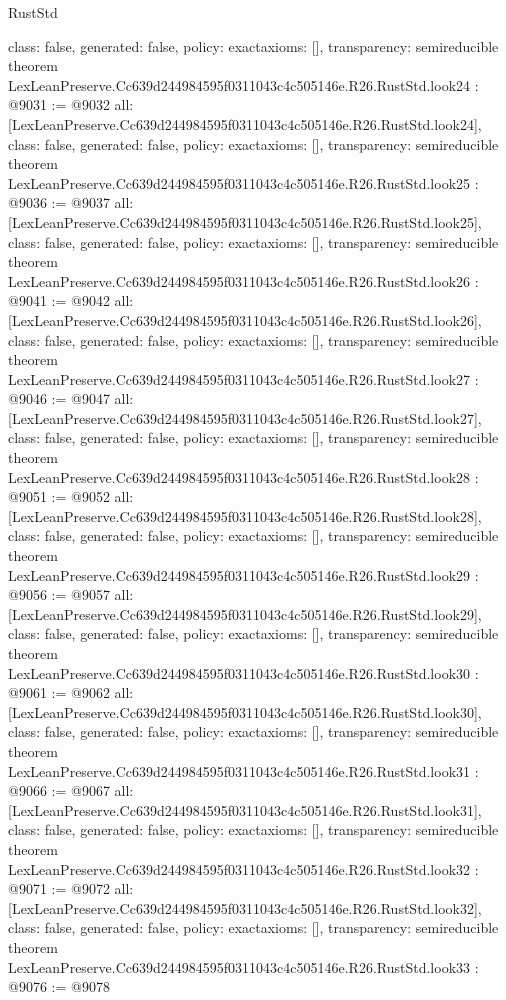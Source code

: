 \begin{lexlean}{RustStd}
\begin{coremodule}
{  class: false,
  generated: false,
  policy: exact{axioms: []},
  transparency: semireducible
}
theorem LexLeanPreserve.Cc639d244984595f0311043c4c505146e.R26.RustStd.look24 : @9031 := @9032 {
  all: [LexLeanPreserve.Cc639d244984595f0311043c4c505146e.R26.RustStd.look24],
  class: false,
  generated: false,
  policy: exact{axioms: []},
  transparency: semireducible
}
theorem LexLeanPreserve.Cc639d244984595f0311043c4c505146e.R26.RustStd.look25 : @9036 := @9037 {
  all: [LexLeanPreserve.Cc639d244984595f0311043c4c505146e.R26.RustStd.look25],
  class: false,
  generated: false,
  policy: exact{axioms: []},
  transparency: semireducible
}
theorem LexLeanPreserve.Cc639d244984595f0311043c4c505146e.R26.RustStd.look26 : @9041 := @9042 {
  all: [LexLeanPreserve.Cc639d244984595f0311043c4c505146e.R26.RustStd.look26],
  class: false,
  generated: false,
  policy: exact{axioms: []},
  transparency: semireducible
}
theorem LexLeanPreserve.Cc639d244984595f0311043c4c505146e.R26.RustStd.look27 : @9046 := @9047 {
  all: [LexLeanPreserve.Cc639d244984595f0311043c4c505146e.R26.RustStd.look27],
  class: false,
  generated: false,
  policy: exact{axioms: []},
  transparency: semireducible
}
theorem LexLeanPreserve.Cc639d244984595f0311043c4c505146e.R26.RustStd.look28 : @9051 := @9052 {
  all: [LexLeanPreserve.Cc639d244984595f0311043c4c505146e.R26.RustStd.look28],
  class: false,
  generated: false,
  policy: exact{axioms: []},
  transparency: semireducible
}
theorem LexLeanPreserve.Cc639d244984595f0311043c4c505146e.R26.RustStd.look29 : @9056 := @9057 {
  all: [LexLeanPreserve.Cc639d244984595f0311043c4c505146e.R26.RustStd.look29],
  class: false,
  generated: false,
  policy: exact{axioms: []},
  transparency: semireducible
}
theorem LexLeanPreserve.Cc639d244984595f0311043c4c505146e.R26.RustStd.look30 : @9061 := @9062 {
  all: [LexLeanPreserve.Cc639d244984595f0311043c4c505146e.R26.RustStd.look30],
  class: false,
  generated: false,
  policy: exact{axioms: []},
  transparency: semireducible
}
theorem LexLeanPreserve.Cc639d244984595f0311043c4c505146e.R26.RustStd.look31 : @9066 := @9067 {
  all: [LexLeanPreserve.Cc639d244984595f0311043c4c505146e.R26.RustStd.look31],
  class: false,
  generated: false,
  policy: exact{axioms: []},
  transparency: semireducible
}
theorem LexLeanPreserve.Cc639d244984595f0311043c4c505146e.R26.RustStd.look32 : @9071 := @9072 {
  all: [LexLeanPreserve.Cc639d244984595f0311043c4c505146e.R26.RustStd.look32],
  class: false,
  generated: false,
  policy: exact{axioms: []},
  transparency: semireducible
}
theorem LexLeanPreserve.Cc639d244984595f0311043c4c505146e.R26.RustStd.look33 : @9076 := @9078 {
}
\end{coremodule}
\end{lexlean}
